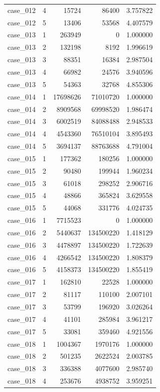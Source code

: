 \begin{longtable}{lrrrr}
case\_012 & 4 & 15724 & 86400 & 3.757822 \\
case\_012 & 5 & 13406 & 53568 & 4.407579 \\
case\_013 & 1 & 263949 & 0 & 1.000000 \\
case\_013 & 2 & 132198 & 8192 & 1.996619 \\
case\_013 & 3 & 88351 & 16384 & 2.987504 \\
case\_013 & 4 & 66982 & 24576 & 3.940596 \\
case\_013 & 5 & 54363 & 32768 & 4.855306 \\
case\_014 & 1 & 17698626 & 71010720 & 1.000000 \\
case\_014 & 2 & 8909568 & 69998520 & 1.986474 \\
case\_014 & 3 & 6002519 & 84088488 & 2.948533 \\
case\_014 & 4 & 4543360 & 76510104 & 3.895493 \\
case\_014 & 5 & 3694137 & 88763688 & 4.791004 \\
case\_015 & 1 & 177362 & 180256 & 1.000000 \\
case\_015 & 2 & 90480 & 199944 & 1.960234 \\
case\_015 & 3 & 61018 & 298252 & 2.906716 \\
case\_015 & 4 & 48866 & 365824 & 3.629558 \\
case\_015 & 5 & 44068 & 331776 & 4.024735 \\
case\_016 & 1 & 7715523 & 0 & 1.000000 \\
case\_016 & 2 & 5440637 & 134500220 & 1.418129 \\
case\_016 & 3 & 4478897 & 134500220 & 1.722639 \\
case\_016 & 4 & 4266542 & 134500220 & 1.808379 \\
case\_016 & 5 & 4158373 & 134500220 & 1.855419 \\
case\_017 & 1 & 162810 & 22528 & 1.000000 \\
case\_017 & 2 & 81117 & 110100 & 2.007101 \\
case\_017 & 3 & 53799 & 196920 & 3.026264 \\
case\_017 & 4 & 41101 & 285984 & 3.961217 \\
case\_017 & 5 & 33081 & 359460 & 4.921556 \\
case\_018 & 1 & 1004367 & 1970176 & 1.000000 \\
case\_018 & 2 & 501235 & 2622524 & 2.003785 \\
case\_018 & 3 & 336388 & 4077600 & 2.985740 \\
case\_018 & 4 & 253676 & 4938752 & 3.959251 \\

\end{longtable}
